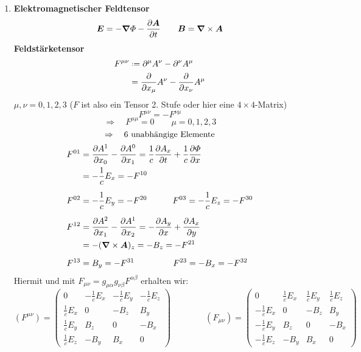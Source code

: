 \begin{enumerate}[1)]
	
	\item \textbf{Elektromagnetischer Feldtensor}
	\begin{equation*}
	\bm{E} = - \bm{\nabla} \varPhi - \frac{\partial \bm{A}}{\partial t} \qquad \bm{B} = \bm{\nabla} \times \bm{A}
	\end{equation*}
	\textbf{Feldstärketensor}
	\begin{align*}
	F^{\mu \nu} &\defeq \partial^{\mu} A^{\nu} - \partial^{\nu} A^{\mu}\\
	&= \prt{}{x_{\mu}} A^{\nu} - \prt{}{x_{\nu}} A^{\mu}
	\end{align*}
	$ \mu, \nu = 0, 1, 2, 3 $ ($ F $ ist also ein Tensor 2. Stufe oder hier eine $ 4 \times 4 $-Matrix)
	\begin{equation*}
	F^{\mu \nu} = - F^{\nu \mu}
	\end{equation*}
	\begin{equation*}
	\Rightarrow \quad F^{\mu \mu} = 0 \qquad \mu = 0, 1, 2, 3
	\end{equation*}
	\begin{equation*}
	\Rightarrow \quad 6 \textrm{ unabhängige Elemente}
	\end{equation*}
	\begin{align*}
	F^{01} &= \frac{\partial A^{1}}{\partial x_0} - \frac{\partial A^0}{\partial x_1} = \frac{1}{c} \frac{\partial A_x}{\partial t} + \frac{1}{c} \frac{\partial \varPhi}{\partial x}\\
	&= - \frac{1}{c} E_x = - F^{10}\\[5pt]
	F^{02} &= - \frac{1}{c} E_y = - F^{20} \qquad \quad F^{03} = - \frac{1}{c} E_z = - F^{30} \\[5pt]
	F^{12} &= \frac{\partial A^2}{\partial x_1} - \frac{\partial A^1}{\partial x_2} = - \frac{\partial A_y}{\partial x} + \frac{\partial A_x}{\partial y}\\
	&= - (\bm{\nabla} \times \bm{A})_z = - B_z = - F^{21}\\[5pt]
	F^{13} &= B_y = - F^{31} \qquad \qquad \ \: F^{23} = - B_x = - F^{32}
	\end{align*}
	Hiermit und mit $ F_{\mu \nu} = g_{\mu \alpha} g_{\nu \beta} F^{\alpha \beta} $ erhalten wir:
	\begin{equation*}
	(F^{\mu \nu}) = \begin{pmatrix}
	0 & - \frac{1}{c} E_x & - \frac{1}{c} E_y & - \frac{1}{c} E_z \\[10pt]
	\frac{1}{c} E_x & 0 & - B_z & B_y \\[10pt]
	\frac{1}{c} E_y & B_z & 0 & - B_x \\[10pt]
	\frac{1}{c} E_z & - B_y & B_x & 0
	\end{pmatrix} \qquad \qquad
	(F_{\mu \nu}) = \begin{pmatrix}
	0 & \frac{1}{c} E_x & \frac{1}{c} E_y & \frac{1}{c} E_z \\[10pt]
	- \frac{1}{c} E_x & 0 & - B_z & B_y \\[10pt]
	- \frac{1}{c} E_y & B_z & 0 & - B_x \\[10pt]
	- \frac{1}{c} E_z & - B_y & B_x & 0
	\end{pmatrix}
	\end{equation*}
\end{enumerate}

